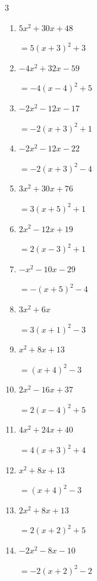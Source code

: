 \begin{multicols}{3}
\begin{enumerate}
  \item $5x^{2}+30x+48$

        $=5\left( x+3\right)^{2}+3$

  \item $-4x^{2}+32x-59$

        $=-4\left( x-4\right)^{2}+5$

  \item $-2x^{2}-12x-17$

        $=-2\left( x+3\right)^{2}+1$

  \item $-2x^{2}-12x-22$

        $=-2\left( x+3\right)^{2}-4$

  \item $3x^{2}+30x+76$

        $=3\left( x+5\right)^{2}+1$

  \item $2x^{2}-12x+19$

        $=2\left( x-3\right)^{2}+1$

  \item $-x^{2}-10x-29$

        $=-\left( x+5\right)^{2}-4$

  \item $3x^{2}+6x$

        $=3\left( x+1\right)^{2}-3$

  \item $x^{2}+8x+13$

        $=\left( x+4\right)^{2}-3$

\columnbreak %

  \item $2x^{2}-16x+37$

        $=2\left( x-4\right)^{2}+5$

  \item $4x^{2}+24x+40$

        $=4\left( x+3\right)^{2}+4$

  \item $x^{2}+8x+13$

        $=\left( x+4\right)^{2}-3$

  \item $2x^{2}+8x+13$

        $=2\left( x+2\right)^{2}+5$

  \item $-2x^{2}-8x-10$

        $=-2\left( x+2\right)^{2}-2$


\end{enumerate}
\end{multicols}
